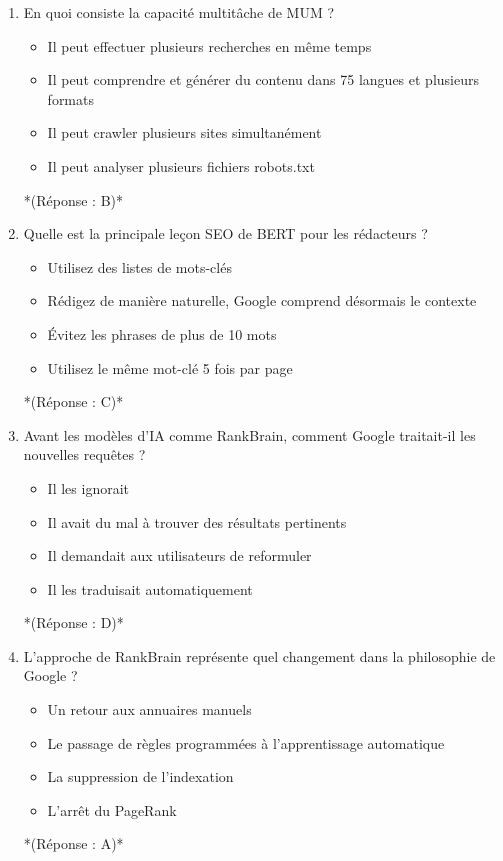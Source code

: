 \documentclass[12pt,a4paper,twoside]{report}
\begin{document}
\begin{enumerate}
\item En quoi consiste la capacité multitâche de MUM ?
\begin{itemize}
\item[A)] Il peut effectuer plusieurs recherches en même temps
\item[B)] Il peut comprendre et générer du contenu dans 75 langues et plusieurs formats
\item[C)] Il peut crawler plusieurs sites simultanément
\item[D)] Il peut analyser plusieurs fichiers robots.txt
\end{itemize}
*(Réponse : B)*

\item Quelle est la principale leçon SEO de BERT pour les rédacteurs ?
\begin{itemize}
\item[A)] Utilisez des listes de mots-clés
\item[B)] Rédigez de manière naturelle, Google comprend désormais le contexte
\item[C)] Évitez les phrases de plus de 10 mots
\item[D)] Utilisez le même mot-clé 5 fois par page
\end{itemize}
*(Réponse : C)*

\item Avant les modèles d'IA comme RankBrain, comment Google traitait-il les nouvelles requêtes ?
\begin{itemize}
\item[A)] Il les ignorait
\item[B)] Il avait du mal à trouver des résultats pertinents
\item[C)] Il demandait aux utilisateurs de reformuler
\item[D)] Il les traduisait automatiquement
\end{itemize}
*(Réponse : D)*

\item L'approche de RankBrain représente quel changement dans la philosophie de Google ?
\begin{itemize}
\item[A)] Un retour aux annuaires manuels
\item[B)] Le passage de règles programmées à l'apprentissage automatique
\item[C)] La suppression de l'indexation
\item[D)] L'arrêt du PageRank
\end{itemize}
*(Réponse : A)*


\end{enumerate}
\end{document}
